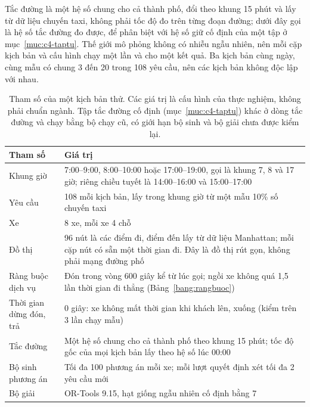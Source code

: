Tắc đường là một hệ số chung cho cả thành phố, đổi theo khung 15 phút và lấy từ dữ liệu chuyến taxi, không phải tốc
độ đo trên từng đoạn đường; dưới đây gọi là hệ số tắc đường đo được, để phân biệt với hệ số giữ cố định của một tập
ở mục~\ref{muc:c4-taptu}. Thế giới mô phỏng không có nhiễu ngẫu nhiên, nên mỗi cặp kịch bản và cấu hình chạy một lần
và cho một kết quả. Ba kịch bản cùng ngày, cùng mẫu có chung 3 đến 20 trong 108 yêu cầu, nên các kịch bản không độc
lập với nhau.

\begin{table}[htbp]
\centering
\caption{Tham số của một kịch bản thử. Các giá trị là cấu hình của thực nghiệm, không phải chuẩn ngành. Tập tắc
đường cố định (mục~\ref{muc:c4-taptu}) khác ở dòng tắc đường và chạy bằng bộ chạy cũ, có giới hạn bộ sinh và bộ
giải chưa được kiểm lại.}
\label{bang:c4-thamso}
\small
\begin{tabular}{@{}p{4.0cm}p{11.0cm}@{}}
\toprule
\textbf{Tham số} & \textbf{Giá trị}\\
\midrule
Khung giờ & 7:00--9:00, 8:00--10:00 hoặc 17:00--19:00, gọi là khung 7, 8 và 17 giờ; riêng chiều tuyết
là 14:00--16:00 và 15:00--17:00\\
Yêu cầu & 108 mỗi kịch bản, lấy trong khung giờ từ một mẫu 10\% số chuyến taxi\\
Xe & 8 xe, mỗi xe 4 chỗ\\
Đồ thị & 96 nút là các điểm đi, điểm đến lấy từ dữ liệu Manhattan; mỗi cặp nút có sẵn một thời gian đi. Đây là
đồ thị rút gọn, không phải mạng đường phố\\
Ràng buộc dịch vụ & Đón trong vòng 600 giây kể từ lúc gọi; ngồi xe không quá 1,5 lần thời gian đi
thẳng (Bảng~\ref{bang:rangbuoc})\\
Thời gian dừng đón, trả & 0 giây: xe không mất thời gian khi khách lên, xuống (kiểm trên 3 lần chạy mẫu)\\
Tắc đường & Một hệ số chung cho cả thành phố theo khung 15 phút; tốc độ gốc của mọi kịch bản lấy theo hệ số lúc
00:00\\
Bộ sinh phương án & Tối đa 100 phương án mỗi xe; mỗi lượt quyết định xét tối đa 2 yêu cầu mới\\
Bộ giải & OR-Tools 9.15, hạt giống ngẫu nhiên cố định bằng 7\\
\bottomrule
\end{tabular}
\end{table}

